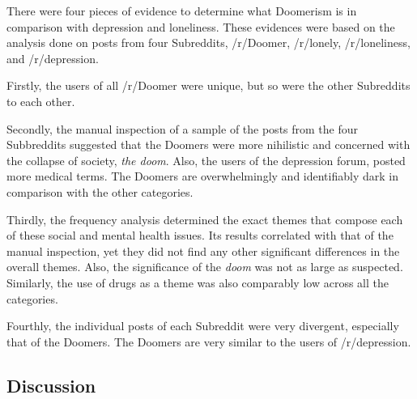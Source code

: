 \documentclass[../report.tex]{subfiles}
\begin{document}
There were four pieces of evidence to determine what Doomerism is in comparison with depression and loneliness. 
These evidences were based on the analysis done on posts from four Subreddits, /r/Doomer, /r/lonely, /r/loneliness, and /r/depression.

Firstly, the users of all /r/Doomer were unique, but so were the other Subreddits to each other. 

Secondly, the manual inspection of a sample of the posts from the four Subbreddits suggested that the Doomers were more nihilistic and concerned with the collapse of society, \textit{the doom}. Also, the users of the depression forum, posted more medical terms.
The Doomers are overwhelmingly and identifiably dark in comparison with the other categories.

Thirdly, the frequency analysis determined the exact themes that compose each of these social and mental health issues.
Its results correlated with that of the manual inspection, yet they did not find any other significant differences in the overall themes. 
Also, the significance of the \textit{doom} was not as large as suspected.
Similarly, the use of drugs as a theme was also comparably low across all the categories. 

Fourthly, the individual posts of each Subreddit were very divergent, especially that of the Doomers.
The Doomers are very similar to the users of /r/depression. 

\subsection{Discussion}

\end{document}
